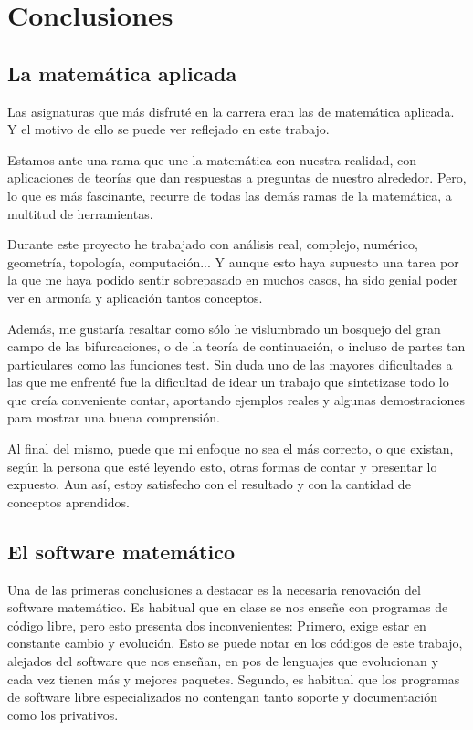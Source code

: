 
\chapter{Conclusiones}

\label{ch:conclusions}

\section{La matemática aplicada}

Las asignaturas que más disfruté en la carrera eran las de matemática aplicada. Y el motivo de ello se puede ver reflejado en este trabajo. 

Estamos ante una rama que une la matemática con nuestra realidad, con aplicaciones de teorías que dan respuestas a preguntas de nuestro alrededor. Pero, lo que es más fascinante, recurre de todas las demás ramas de la matemática, a multitud de herramientas.

Durante este proyecto he trabajado con análisis real, complejo, numérico, geometría, topología, computación...
Y aunque esto haya supuesto una tarea por la que me haya podido sentir sobrepasado en muchos casos, ha sido genial poder ver en armonía y aplicación tantos conceptos.

Además, me gustaría resaltar como sólo he vislumbrado un bosquejo del gran campo de las bifurcaciones, o de la teoría de continuación, o incluso de partes tan particulares como las funciones test. Sin duda uno de las mayores dificultades a las que me enfrenté fue la dificultad de idear un trabajo que sintetizase todo lo que creía conveniente contar, aportando ejemplos reales y algunas demostraciones para mostrar una buena comprensión. 

Al final del mismo, puede que mi enfoque no sea el más correcto, o que existan, según la persona que esté leyendo esto, otras formas de contar y presentar lo expuesto. Aun así, estoy satisfecho con el resultado y con la cantidad de conceptos aprendidos. 



\section{El software matemático}
Una de las primeras conclusiones a destacar es la necesaria renovación del software matemático.
Es habitual que en clase se nos enseñe con programas de código libre, pero esto presenta dos inconvenientes:
Primero, exige estar en constante cambio y evolución. Esto se puede notar en los códigos de este trabajo, alejados del software que nos enseñan, en pos de lenguajes que evolucionan y cada vez tienen más y mejores paquetes. 
Segundo, es habitual que los programas de software libre especializados no contengan tanto soporte y documentación como los privativos.

